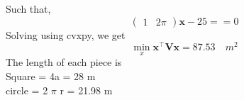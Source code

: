 \documentclass[journal,12pt,twocolumn]{IEEEtran}
\let\vec\mathbf
\providecommand{\brak}[1]{\ensuremath{\left(#1\right)}}
\begin{document}
\noindent Such that, 
\begin{equation}
\begin{pmatrix}1 & 2\pi\end{pmatrix}  \vec{x} -25 == 0
\end{equation}
Solving using cvxpy, we get
\begin{equation}
\min_{x} \vec{x}^{\top}\vec{V}\vec{x} = 87.53 \quad m^2
\end{equation}
The length of each piece is \\
Square = 4a = 28 m \\
circle = 2 $\pi$ r = 21.98 m  
\end{document}
